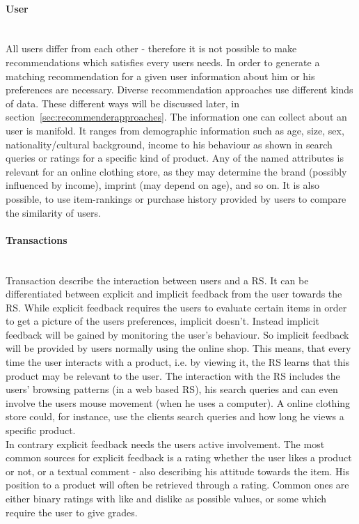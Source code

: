 \paragraph{User}\hfill\\
All users differ from each other - therefore it is not possible to make recommendations which satisfies every users needs.
In order to generate a matching recommendation for a given user information about him or his preferences are necessary.
Diverse recommendation approaches use different kinds of data.
These different ways will be discussed later, in section~\ref{sec:recommenderapproaches}.
The information one can collect about an user is manifold.
It ranges from demographic information such as age, size, sex, nationality/cultural background, income to his behaviour as shown in search queries or ratings for a specific kind of product.
Any of the named attributes is relevant for an online clothing store, as they may determine the brand (possibly influenced by income), imprint (may depend on age), and so on.\citep[p.8-9]{ricci:2011}
It is also possible, to use item-rankings or purchase history provided by users to compare the similarity of users.\citep[p.~377-378]{pradel:2011}

\paragraph{Transactions}\hfill\\
\label{sec:feedback}
Transaction describe the interaction between users and a RS.\citep[p.~9]{ricci:2011}
It can be differentiated between explicit and implicit feedback from the user towards the RS.
While explicit feedback requires the users to evaluate certain items in order to get a picture of the users preferences, implicit doesn't.
Instead implicit feedback will be gained by monitoring the user's behaviour.\citep[p.~76-77]{lops:2011}
So implicit feedback will be provided by users normally using the online shop.
This means, that every time the user interacts with a product, i.e. by viewing it, the RS learns that this product may be relevant to the user.\citep{taghipour:2007}
The interaction with the RS includes the users' browsing patterns (in a web based RS), his search queries and can even involve the users mouse movement (when he uses a computer).\citep[p.~146]{koren:2011}
A online clothing store could, for instance, use the clients search queries and how long he views a specific product.
\\
In contrary explicit feedback needs the users active involvement.
The most common sources for explicit feedback is a rating whether the user likes a product or not, or a textual comment - also describing his attitude towards the item.
His position to a product will often be retrieved through a rating.
Common ones are either binary ratings with like and dislike as possible values, or some which require the user to give grades.\citep[p.~77]{lops:2011}


